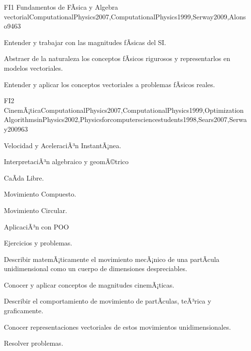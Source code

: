 \begin{syllabus}
\begin{unit}{FI1 Fundamentos de FÃ­sica y Algebra vectorial}{ComputationalPhysics2007,ComputationalPhysics1999,Serway2009,Alonso94}{6}{3}
   \begin{learningoutcomes}
      \item Entender y trabajar con las magnitudes fÃ­sicas del SI.
      \item Abstraer de la naturaleza los conceptos fÃ­sicos rigurosos y
      representarlos en modelos vectoriales.
      \item Entender y aplicar los conceptos vectoriales a problemas fÃ­sicos reales.
   \end{learningoutcomes}
\end{unit}

\begin{unit}{FI2 CinemÃ¡tica}{ComputationalPhysics2007,ComputationalPhysics1999,OptimizationAlgorithmsinPhysics2002,Physicsforcomputersciencestudents1998,Sears2007,Serway2009}{6}{3}
\begin{topics}
      \item Velocidad y AceleraciÃ³n InstantÃ¡nea.
      \item InterpretaciÃ³n algebraico y geomÃ©trico
      \item CaÃ­da Libre.
      \item Movimiento Compuesto.
      \item Movimiento Circular.
      \item AplicaciÃ³n con POO
      \item Ejercicios y problemas.
    \end{topics}
   \begin{learningoutcomes}
      \item Describir matemÃ¡ticamente el movimiento mecÃ¡nico de una partÃ­cula unidimensional como un cuerpo de dimensiones despreciables.
      \item Conocer y aplicar conceptos de magnitudes cinemÃ¡ticas.
      \item Describir el comportamiento de movimiento de partÃ­culas, teÃ³rica y graficamente.
      \item Conocer representaciones vectoriales de estos movimientos unidimensionales.
      \item Resolver problemas.
   \end{learningoutcomes}
\end{unit}


\end{syllabus}
